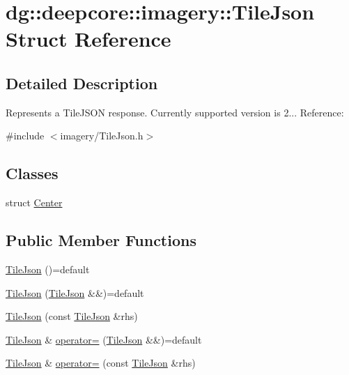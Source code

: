 \hypertarget{structdg_1_1deepcore_1_1imagery_1_1_tile_json}{}\section{dg\+:\+:deepcore\+:\+:imagery\+:\+:Tile\+Json Struct Reference}
\label{structdg_1_1deepcore_1_1imagery_1_1_tile_json}


\subsection{Detailed Description}
Represents a Tile\+J\+S\+ON response. Currently supported version is 2... Reference\+: \href{https://github.com/mapbox/tilejson-spec/tree/master/2.0.0}{\tt } 

{\ttfamily \#include $<$imagery/\+Tile\+Json.\+h$>$}

\subsection*{Classes}
\begin{DoxyCompactItemize}
\item 
struct \hyperlink{structdg_1_1deepcore_1_1imagery_1_1_tile_json_1_1_center}{Center}
\end{DoxyCompactItemize}
\subsection*{Public Member Functions}
\begin{DoxyCompactItemize}
\item 
\hyperlink{structdg_1_1deepcore_1_1imagery_1_1_tile_json_a6cf2c225e8f36239a8d9c0f96bda6bf1}{Tile\+Json} ()=default
\item 
\hyperlink{structdg_1_1deepcore_1_1imagery_1_1_tile_json_acc6e93165ccda5b1d70198390d1fa9ef}{Tile\+Json} (\hyperlink{structdg_1_1deepcore_1_1imagery_1_1_tile_json}{Tile\+Json} \&\&)=default
\item 
\hyperlink{structdg_1_1deepcore_1_1imagery_1_1_tile_json_a6d5b4ee20a818a29de0eb6feae9d8431}{Tile\+Json} (const \hyperlink{structdg_1_1deepcore_1_1imagery_1_1_tile_json}{Tile\+Json} \&rhs)
\item 
\hyperlink{structdg_1_1deepcore_1_1imagery_1_1_tile_json}{Tile\+Json} \& \hyperlink{structdg_1_1deepcore_1_1imagery_1_1_tile_json_ad1fc21511a31885373ac1987215b32a7}{operator=} (\hyperlink{structdg_1_1deepcore_1_1imagery_1_1_tile_json}{Tile\+Json} \&\&)=default
\item 
\hyperlink{structdg_1_1deepcore_1_1imagery_1_1_tile_json}{Tile\+Json} \& \hyperlink{structdg_1_1deepcore_1_1imagery_1_1_tile_json_ad8427c54a7785023c1e501ad70734089}{operator=} (const \hyperlink{structdg_1_1deepcore_1_1imagery_1_1_tile_json}{Tile\+Json} \&rhs)
\end{DoxyCompactItemize}
